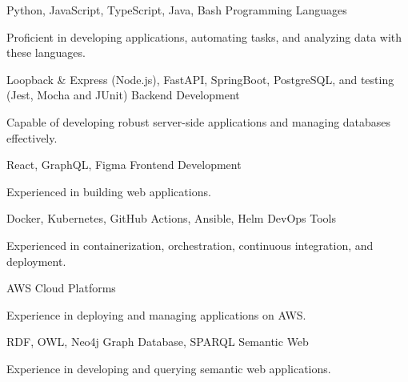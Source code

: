 \begin{cventries}
  \cventry
  {Python, JavaScript, TypeScript, Java, Bash}
  {Programming Languages}
  {}
  {}
  {
    \begin{cvitems}
      \item {Proficient in developing applications, automating tasks, and analyzing data with these languages.}
    \end{cvitems}
  }

  \cventry
  {Loopback \& Express (Node.js), FastAPI, SpringBoot, PostgreSQL, and testing (Jest, Mocha and JUnit)}
  {Backend Development}
  {}
  {}
  {
    \begin{cvitems}
      \item{Capable of developing robust server-side applications and managing databases effectively.}
    \end{cvitems}
  }

  \cventry
  {React, GraphQL, Figma}
  {Frontend Development}
  {}
  {}
  {
    \begin{cvitems}
      \item {Experienced in building web applications.}
    \end{cvitems}
  }

  \cventry
  {Docker, Kubernetes, GitHub Actions, Ansible, Helm}
  {DevOps Tools}
  {}
  {}
  {
    \begin{cvitems}
      \item {Experienced in containerization, orchestration, continuous integration, and deployment.}
    \end{cvitems}
  }

  \cventry
  {AWS}
  {Cloud Platforms}
  {}
  {}
  {
    \begin{cvitems}
      \item {Experience in deploying and managing applications on AWS.}
    \end{cvitems}
  }


  \cventry
  {RDF, OWL, Neo4j Graph Database, SPARQL}
  {Semantic Web}
  {}
  {}
  {
    \begin{cvitems}
      \item {Experience in developing and querying semantic web applications.}
    \end{cvitems}
  }

\end{cventries}